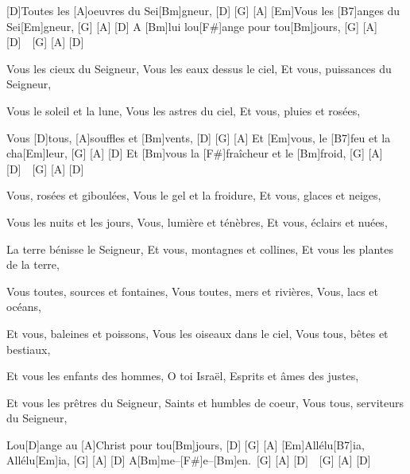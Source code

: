\IncludeLilypond

\vfill\eject

[D]Toutes les [A]oeuvres du Sei[Bm]gneur, [D] [G] [A]
[Em]Vous les [B7]anges du Sei[Em]gneur, [G] [A] [D]
A [Bm]lui lou[F#]ange pour tou[Bm]jours, [G] [A] [D]\ \ [G] [A] [D]

Vous les cieux du Seigneur,
Vous les eaux dessus le ciel,
Et vous, puissances du Seigneur,

Vous le soleil et la lune,
Vous les astres du ciel,
Et vous, pluies et rosées,

Vous [D]tous, [A]souffles et [Bm]vents, [D] [G] [A]
Et [Em]vous, le [B7]feu et la cha[Em]leur, [G] [A] [D]
Et [Bm]vous la [F#]fraîcheur et le [Bm]froid, [G] [A] [D]\ \ [G] [A] [D]

Vous, rosées et giboulées,
Vous le gel et la froidure,
Et vous, glaces et neiges,

Vous les nuits et les jours,
Vous, lumière et ténèbres,
Et vous, éclairs et nuées,

La terre bénisse le Seigneur,
Et vous, montagnes et collines,
Et vous les plantes de la terre,

Vous toutes, sources et fontaines,
Vous toutes, mers et rivières,
Vous, lacs et océans,

Et vous, baleines et poissons,
Vous les oiseaux dans le ciel,
Vous tous, bêtes et bestiaux,

Et vous les enfants des hommes,
O toi Israël,
Esprits et âmes des justes,

Et vous les prêtres du Seigneur,
Saints et humbles de coeur,
Vous tous, serviteurs du Seigneur,

Lou[D]ange au [A]Christ pour tou[Bm]jours, [D] [G] [A]
[Em]Allélu[B7]ia, Allélu[Em]ia, [G] [A] [D]
A[Bm]me--[F#]e--[Bm]en.\ [G] [A] [D]\ \ [G] [A] [D]
